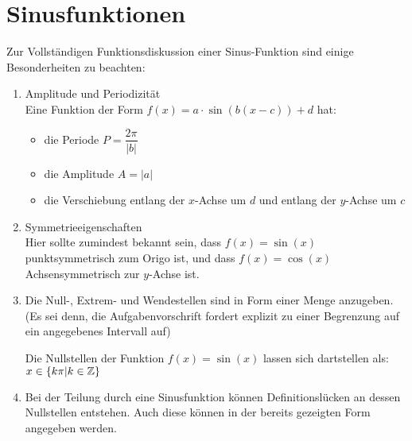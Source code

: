 \section{Sinusfunktionen}
Zur Vollständigen Funktionsdiskussion einer Sinus-Funktion sind einige Besonderheiten zu beachten:
\begin{enumerate}
  \item Amplitude und Periodizität\\
  Eine Funktion der Form $f(x)=a\cdot\sin(b(x-c))+d$ hat:
  \begin{itemize}
    \item die Periode $P = \dfrac{2\pi}{|b|}$
    \item die Amplitude $A = |a|$
    \item die Verschiebung entlang der $x$-Achse um $d$ und entlang der $y$-Achse um $c$
    \end{itemize}
  \item Symmetrieeigenschaften\\
  Hier sollte zumindest bekannt sein, dass $f(x)=\sin(x)$ punktsymmetrisch zum Origo ist, und dass $f(x)=\cos(x)$ Achsensymmetrisch zur $y$-Achse ist.
  \item Die Null-, Extrem- und Wendestellen sind in Form einer Menge anzugeben. (Es sei denn, die Aufgabenvorschrift fordert explizit zu einer Begrenzung auf ein angegebenes Intervall auf)\\
  \begin{Beispiel}
    Die Nullstellen der Funktion $f(x)=\sin(x)$ lassen sich dartstellen als: $x \in \{k\pi|k \in \mathbb{Z}\}$
  \end{Beispiel}
  \item Bei der Teilung durch eine Sinusfunktion können Definitionslücken an dessen Nullstellen entstehen. Auch diese können in der bereits gezeigten Form angegeben werden.
  \end{enumerate}
